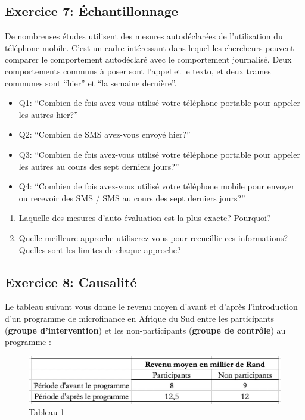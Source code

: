\documentclass[]{article}
\providecommand{\tightlist}{%
  \setlength{\itemsep}{0pt}\setlength{\parskip}{0pt}}
\begin{document}
\subsection{Exercice 7:
Échantillonnage}\label{exercice-7-echantillonnage}

De nombreuses études utilisent des mesures autodéclarées de
l'utilisation du téléphone mobile. C'est un cadre intéressant dans
lequel les chercheurs peuvent comparer le comportement autodéclaré avec
le comportement journalisé. Deux comportements communs à poser sont
l'appel et le texto, et deux trames communes sont ``hier'' et ``la
semaine dernière''.

\begin{itemize}
\tightlist
\item
  Q1: ``Combien de fois avez-vous utilisé votre téléphone portable pour
  appeler les autres hier?''
\item
  Q2: ``Combien de SMS avez-vous envoyé hier?''
\item
  Q3: ``Combien de fois avez-vous utilisé votre téléphone portable pour
  appeler les autres au cours des sept derniers jours?''
\item
  Q4: ``Combien de fois avez-vous utilisé votre téléphone mobile pour
  envoyer ou recevoir des SMS / SMS au cours des sept derniers jours?''
\end{itemize}

\begin{enumerate}
\def\labelenumi{\arabic{enumi}.}
\tightlist
\item
  Laquelle des mesures d'auto-évaluation est la plus exacte? Pourquoi?
\item
  Quelle meilleure approche utiliserez-vous pour recueillir ces
  informations? Quelles sont les limites de chaque approche?
\end{enumerate}

\subsection{Exercice 8: Causalité}\label{exercice-8-causalite}

Le tableau suivant vous donne le revenu moyen d'avant et d'après
l'introduction d'un programme de microfinance en Afrique du Sud entre
les participants (\textbf{groupe d'intervention}) et les
non-participants (\textbf{groupe de contrôle}) au programme :

\begin{figure}[H]
\includegraphics[width=0.9\linewidth]{Tableau1} \caption{Tableau 1}\label{fig:global_options}
\end{figure}
\end{document}
